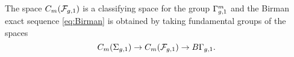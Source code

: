 The space $C_m(\mathcal{F}_{g,1})$ is a classifying space for the
group $\Gamma_{g,1}^m$ and the Birman exact sequence \ref{eq:Birman} is obtained by taking fundamental
groups of the spaces
\begin{equation}\label{eq:Birmanbundle}
C_m(\Sigma_{g,1})\to C_m(\mathcal{F}_{g,1})\to B\Gamma_{g,1}.
\end{equation}

% 

